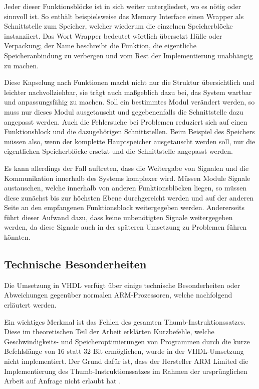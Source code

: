 \documentclass[11pt,a4paper,titlepage]{article}
\begin{document}
Jeder dieser Funktionsblöcke ist in sich weiter untergliedert, wo es nötig oder sinnvoll ist. So enthält beispielsweise das Memory Interface einen Wrapper als Schnittstelle zum Speicher, welcher wiederum die einzelnen Speicherblöcke instanziiert. Das Wort Wrapper bedeutet wörtlich übersetzt Hülle oder Verpackung; der Name beschreibt die Funktion, die eigentliche Speicheranbindung zu verbergen und vom Rest der Implementierung unabhängig zu machen.

Diese Kapselung nach Funktionen macht nicht nur die Struktur übersichtlich und leichter nachvollziehbar, sie trägt auch maßgeblich dazu bei, das System wartbar und anpassungsfähig zu machen. Soll ein bestimmtes Modul verändert werden, so muss nur dieses Modul ausgetauscht und gegebenenfalls die Schnittstelle dazu angepasst werden. Auch die Fehlersuche bei Problemen reduziert sich auf einen Funktionsblock und die dazugehörigen Schnittstellen. Beim Beispiel des Speichers müssen also, wenn der komplette Hauptspeicher ausgetauscht werden soll, nur die eigentlichen Speicherblöcke ersetzt und die Schnittstelle angepasst werden.

Es kann allerdings der Fall auftreten, dass die Weitergabe von Signalen und die Kommunikation innerhalb des Systems komplexer wird. Müssen Module Signale austauschen, welche innerhalb von anderen Funktionsblöcken liegen, so müssen diese zunächst bis zur höchsten Ebene durchgereicht werden und auf der anderen Seite an den empfangenen Funktionsblock weitergegeben werden. Andererseits führt dieser Aufwand dazu, dass keine unbenötigten Signale weitergegeben werden, da diese Signale auch in der späteren Umsetzung zu Problemen führen könnten.

\subsection{Technische Besonderheiten}

Die Umsetzung in VHDL verfügt über einige technische Besonderheiten oder Abweichungen gegenüber normalen ARM-Prozessoren, welche nachfolgend erläutert werden.

Ein wichtiges Merkmal ist das Fehlen des gesamten Thumb-Instruktionssatzes. Diese im theoretischen Teil der Arbeit erklärten Kurzbefehle, welche Geschwindigkeits- und Speicheroptimierungen von Programmen durch die kurze Befehlslänge von 16 statt 32 Bit ermöglichen, wurde in der VHDL-Umsetzung nicht implementiert. Der Grund dafür ist, dass der Hersteller ARM Limited die Implementierung des Thumb-Instruktionssatzes im Rahmen der ursprünglichen Arbeit auf Anfrage nicht erlaubt hat \cite[S. 6]{Boehme}. 
\end{document}
